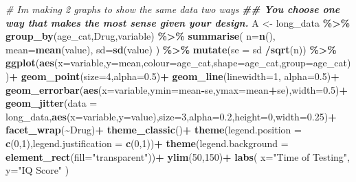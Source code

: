 \documentclass[
]{book}
\newenvironment{Shaded}{\begin{snugshade}}{\end{snugshade}}
\newcommand{\AttributeTok}[1]{\textcolor[rgb]{0.13,0.29,0.53}{#1}}
\newcommand{\CommentTok}[1]{\textcolor[rgb]{0.56,0.35,0.01}{\textit{#1}}}
\newcommand{\DecValTok}[1]{\textcolor[rgb]{0.00,0.00,0.81}{#1}}
\newcommand{\DocumentationTok}[1]{\textcolor[rgb]{0.56,0.35,0.01}{\textbf{\textit{#1}}}}
\newcommand{\FloatTok}[1]{\textcolor[rgb]{0.00,0.00,0.81}{#1}}
\newcommand{\FunctionTok}[1]{\textcolor[rgb]{0.13,0.29,0.53}{\textbf{#1}}}
\newcommand{\NormalTok}[1]{#1}
\newcommand{\OtherTok}[1]{\textcolor[rgb]{0.56,0.35,0.01}{#1}}
\newcommand{\SpecialCharTok}[1]{\textcolor[rgb]{0.81,0.36,0.00}{\textbf{#1}}}
\newcommand{\StringTok}[1]{\textcolor[rgb]{0.31,0.60,0.02}{#1}}
\begin{document}
\begin{Shaded}
\begin{Highlighting}[]
\CommentTok{\# I\textquotesingle{}m making 2 graphs to show the same data two ways}
\DocumentationTok{\#\# You choose one way that makes the most sense given your design.}
\NormalTok{A }\OtherTok{\textless{}{-}}\NormalTok{ long\_data }\SpecialCharTok{\%\textgreater{}\%}
  \FunctionTok{group\_by}\NormalTok{(age\_cat,Drug,variable) }\SpecialCharTok{\%\textgreater{}\%}
  \FunctionTok{summarise}\NormalTok{(}
    \AttributeTok{n=}\FunctionTok{n}\NormalTok{(),}
    \AttributeTok{mean=}\FunctionTok{mean}\NormalTok{(value),}
    \AttributeTok{sd=}\FunctionTok{sd}\NormalTok{(value)}
\NormalTok{  ) }\SpecialCharTok{\%\textgreater{}\%} \FunctionTok{mutate}\NormalTok{(}\AttributeTok{se =}\NormalTok{ sd }\SpecialCharTok{/}\FunctionTok{sqrt}\NormalTok{(n)) }\SpecialCharTok{\%\textgreater{}\%}
  \FunctionTok{ggplot}\NormalTok{(}\FunctionTok{aes}\NormalTok{(}\AttributeTok{x=}\NormalTok{variable,}\AttributeTok{y=}\NormalTok{mean,}\AttributeTok{colour=}\NormalTok{age\_cat,}\AttributeTok{shape=}\NormalTok{age\_cat,}\AttributeTok{group=}\NormalTok{age\_cat))}\SpecialCharTok{+}
  \FunctionTok{geom\_point}\NormalTok{(}\AttributeTok{size=}\DecValTok{4}\NormalTok{,}\AttributeTok{alpha=}\FloatTok{0.5}\NormalTok{)}\SpecialCharTok{+}
  \FunctionTok{geom\_line}\NormalTok{(}\AttributeTok{linewidth=}\DecValTok{1}\NormalTok{, }\AttributeTok{alpha=}\FloatTok{0.5}\NormalTok{)}\SpecialCharTok{+}
  \FunctionTok{geom\_errorbar}\NormalTok{(}\FunctionTok{aes}\NormalTok{(}\AttributeTok{x=}\NormalTok{variable,}\AttributeTok{ymin=}\NormalTok{mean}\SpecialCharTok{{-}}\NormalTok{se,}\AttributeTok{ymax=}\NormalTok{mean}\SpecialCharTok{+}\NormalTok{se),}\AttributeTok{width=}\FloatTok{0.5}\NormalTok{)}\SpecialCharTok{+}
  \FunctionTok{geom\_jitter}\NormalTok{(}\AttributeTok{data =}\NormalTok{ long\_data,}\FunctionTok{aes}\NormalTok{(}\AttributeTok{x=}\NormalTok{variable,}\AttributeTok{y=}\NormalTok{value),}\AttributeTok{size=}\DecValTok{3}\NormalTok{,}\AttributeTok{alpha=}\FloatTok{0.2}\NormalTok{,}\AttributeTok{height=}\DecValTok{0}\NormalTok{,}\AttributeTok{width=}\FloatTok{0.25}\NormalTok{)}\SpecialCharTok{+}
  \FunctionTok{facet\_wrap}\NormalTok{(}\SpecialCharTok{\textasciitilde{}}\NormalTok{Drug)}\SpecialCharTok{+}
  \FunctionTok{theme\_classic}\NormalTok{()}\SpecialCharTok{+}
  \FunctionTok{theme}\NormalTok{(}\AttributeTok{legend.position =} \FunctionTok{c}\NormalTok{(}\DecValTok{0}\NormalTok{,}\DecValTok{1}\NormalTok{),}\AttributeTok{legend.justification =} \FunctionTok{c}\NormalTok{(}\DecValTok{0}\NormalTok{,}\DecValTok{1}\NormalTok{))}\SpecialCharTok{+}
  \FunctionTok{theme}\NormalTok{(}\AttributeTok{legend.background =} \FunctionTok{element\_rect}\NormalTok{(}\AttributeTok{fill=}\StringTok{"transparent"}\NormalTok{))}\SpecialCharTok{+}
  \FunctionTok{ylim}\NormalTok{(}\DecValTok{50}\NormalTok{,}\DecValTok{150}\NormalTok{)}\SpecialCharTok{+}
  \FunctionTok{labs}\NormalTok{(}
    \AttributeTok{x=}\StringTok{"Time of Testing"}\NormalTok{,}
    \AttributeTok{y=}\StringTok{"IQ Score"}
\NormalTok{  )}


\end{Highlighting}
\end{Shaded}
\end{document}
